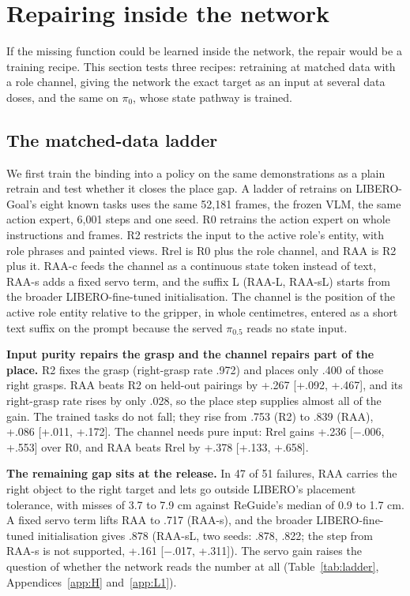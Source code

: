 \documentclass{article}
\newcommand{\mi}{$-$}
\newcommand{\pifive}{$\pi_{0.5}$}
\newcommand{\pizero}{$\pi_0$}
\begin{document}
\section{Repairing inside the network}
\label{sec:inside}

If the missing function could be learned inside the network, the repair would be a training recipe. This section tests three recipes: retraining at matched data with a role channel, giving the network the exact target as an input at several data doses, and the same on \pizero, whose state pathway is trained.

\subsection{The matched-data ladder}
\label{sec:ladder}

We first train the binding into a policy on the same demonstrations as a plain retrain and test whether it closes the place gap. A ladder of retrains on LIBERO-Goal's eight known tasks uses the same 52,181 frames, the frozen VLM, the same action expert, 6,001 steps and one seed. R0 retrains the action expert on whole instructions and frames. R2 restricts the input to the active role's entity, with role phrases and painted views. Rrel is R0 plus the role channel, and RAA is R2 plus it. RAA-c feeds the channel as a continuous state token instead of text, RAA-s adds a fixed servo term, and the suffix L (RAA-L, RAA-sL) starts from the broader LIBERO-fine-tuned initialisation. The channel is the position of the active role entity relative to the gripper, in whole centimetres, entered as a short text suffix on the prompt because the served \pifive{} reads no state input.

\textbf{Input purity repairs the grasp and the channel repairs part of the place.} R2 fixes the grasp (right-grasp rate .972) and places only .400 of those right grasps. RAA beats R2 on held-out pairings by +.267 [+.092, +.467], and its right-grasp rate rises by only .028, so the place step supplies almost all of the gain. The trained tasks do not fall; they rise from .753 (R2) to .839 (RAA), +.086 [+.011, +.172]. The channel needs pure input: Rrel gains +.236 [\mi.006, +.553] over R0, and RAA beats Rrel by +.378 [+.133, +.658].

\textbf{The remaining gap sits at the release.} In 47 of 51 failures, RAA carries the right object to the right target and lets go outside LIBERO's placement tolerance, with misses of 3.7 to 7.9 cm against ReGuide's median of 0.9 to 1.7 cm. A fixed servo term lifts RAA to .717 (RAA-s), and the broader LIBERO-fine-tuned initialisation gives .878 (RAA-sL, two seeds: .878, .822; the step from RAA-s is not supported, +.161 [\mi.017, +.311]). The servo gain raises the question of whether the network reads the number at all (Table~\ref{tab:ladder}, Appendices~\ref{app:H} and~\ref{app:L1}).
\end{document}
